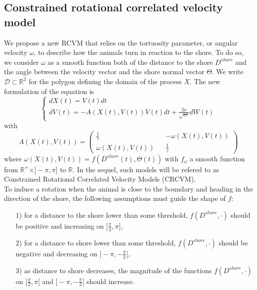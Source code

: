 \documentclass[aoas]{imsart}
\theoremstyle{definition}
\theoremstyle{remark}
\theoremstyle{remark}
\newcommand {\R}{\mathbb{R}}
\newcommand {\1}{\mathbb{1}}
\begin{document}
\subsection{Constrained rotational correlated velocity model}
\label{section: CRCVM}

We propose a new RCVM that relies on the tortuosity parameter, or angular velocity $\omega$, to describe how the animals turn in reaction to the shore. 
To do so, we consider $\omega$ as a smooth function both of the distance to the shore $D^{shore}$ and the angle between the velocity vector and the shore normal vector $\Theta$. 
We write $\mathcal{D} \subset \R^2$ for the polygon defining the domain of the process $X$. The new formulation of the equation is 
\begin{equation} \left\{
	\begin{array}{l}
		dX(t)=V(t) dt \\
		dV(t)=-A(X(t),V(t))V(t)dt+\frac{2\nu}{\sqrt{\pi \tau}} dW(t) 
		
	\end{array}
	\right.
	\label{eq: CRCVM equation}
\end{equation}
with 
\begin{equation} 
	A(X(t),V(t))=\begin{pmatrix} 
		\frac{1}{\tau} && -\omega(X(t),V(t)) \\
		\omega(X(t),V(t)) && \frac{1}{\tau}
	\end{pmatrix}
	\label{eq: CRCVM matrix A}
\end{equation}
where $\omega(X(t),V(t))=f(D^{shore}(t),\Theta(t))$ with  $f_{\omega}$ a smooth function from $\R^{+} \times ]-\pi,\pi]$ to $\R$. In the sequel, such models will be refered to as Constrained Rotational Correlated Velocity Models (CRCVM).\\

To induce a rotation when the animal is close to the boundary and heading in the direction of the shore,
the following assumptions must guide the shape of $f$:
\begin{itemize}
	\item[1)] for a distance to the shore lower than some threshold, $f(D^{shore},\cdot)$ should be positive and increasing on $]\frac{\pi}{2},\pi]$, 
	\item[2)] for a distance to shore  lower than some threshold, $f(D^{shore},\cdot)$ should be negative and decreasing on $]-\pi,-\frac{\pi}{2}[$,
	\item[3)] as distance to shore decreases, the magnitude of the functions  $f(D^{shore},\cdot)$ on $]\frac{\pi}{2},\pi[$  and $]-\pi,-\frac{\pi}{2}[$ should increase.
\end{itemize} 
\end{document}
